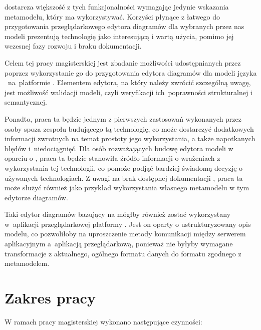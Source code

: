 \SiriusWeb{} dostarcza większość z tych
funkcjonalności wymagając jedynie wskazania metamodelu, który ma wykorzystywać.
Korzyści płynące z łatwego do przygotowania przeglądarkowego edytora diagramów
dla wybranych przez
nas modeli prezentują technologię \SiriusWeb{} jako interesującą i wartą
użycia,
pomimo jej wczesnej fazy rozwoju i braku dokumentacji.

Celem tej pracy magisterskiej jest zbadanie możliwości udostępnianych przez
\SiriusWeb{} poprzez wykorzystanie go do przygotowania edytora
diagramów dla modeli języka \CAL{}~na~platformie \BalticLSC{}. Elementem
edytora,
na który należy zwrócić szczególną uwagę, jest możliwość walidacji modeli,
czyli weryfikacji ich~poprawności strukturalnej i semantycznej.

Ponadto, praca ta będzie jednym z pierwszych zastosowań \SiriusWeb{} wykonanych
przez osoby spoza zespołu budującego tą technologię, co może dostarczyć
dodatkowych informacji zwrotnych na temat prostoty jego wykorzystania, a także
napotkanych błędów i~niedociągnięć. Dla osób rozważających budowę edytora
modeli w oparciu o \SiriusWeb{}, praca ta będzie stanowiła źródło informacji o
wrażeniach z wykorzystania tej technologii, co pomoże podjąć bardziej świadomą
decyzję o używanych technologiach.
Z uwagi na brak dostępnej dokumentacji \SiriusWeb{}, praca ta może służyć
również jako przykład wykorzystania własnego metamodelu w tym edytorze
diagramów.

Taki edytor diagramów bazujący na \SiriusWeb{} mógłby również zostać
wykorzystany
w~aplikacji przeglądarkowej platformy \BalticLSC{}. Jest on oparty o
ustrukturyzowany opis modelu, co pozwoliłoby na uproszczenie metody komunikacji
między serwerem aplikacyjnym a~aplikacją przeglądarkową, ponieważ nie byłyby
wymagane transformacje z aktualnego, ogólnego formatu danych do formatu
zgodnego z metamodelem.

\section{Zakres pracy}

W ramach pracy magisterskiej wykonano następujące czynności:

